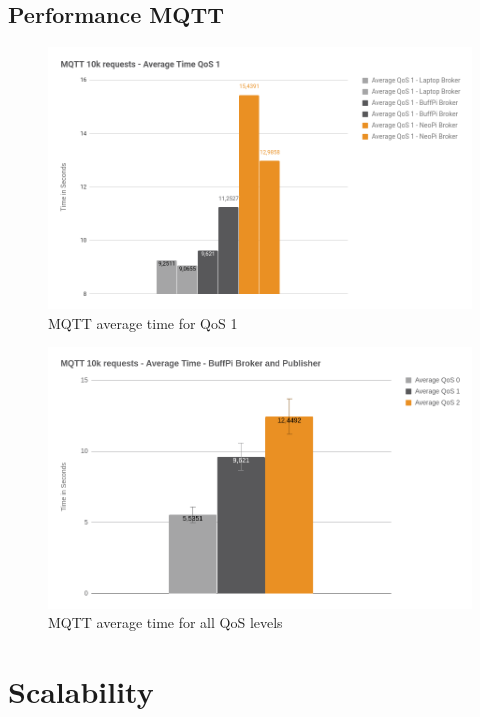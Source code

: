 \subsection{Performance MQTT}
\begin{figure}[H]
    \centering
    \includegraphics[width=\textwidth]{resources/images/performance_mqtt_average_time_qos_1.png}
    \caption[MQTT average time for QoS 1]{MQTT average time for QoS 1}
    \label{fig:performance_mqtt_average_time_qos_1}
\end{figure}
\begin{figure}[H]
    \centering
    \includegraphics[width=\textwidth]{resources/images/performance_mqtt_average_time.png}
    \caption[MQTT average time for all QoS levels]{MQTT average time for all QoS levels}
    \label{fig:performance_mqtt_average_time_all_qos}
\end{figure}


\section{Scalability}
\label{section:scalability}
\doit

